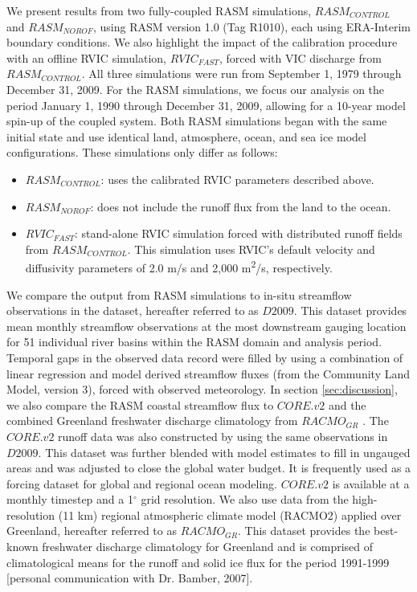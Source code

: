 \documentclass[jgrga, draft]{agutex}
\begin{document}
\begin{article}
We present results from two fully-coupled RASM simulations, $RASM_{CONTROL}$ and $RASM_{NOROF}$, using RASM version 1.0 (Tag R1010), each using ERA-Interim boundary conditions.
We also highlight the impact of the calibration procedure with an offline RVIC simulation, $RVIC_{FAST}$, forced with VIC discharge from $RASM_{CONTROL}$.
All three simulations were run from September 1, 1979 through December 31, 2009.
For the RASM simulations, we focus our analysis on the period January 1, 1990 through December 31, 2009, allowing for a 10-year model spin-up of the coupled system.
Both RASM simulations began with the same initial state \citep[see ][]{Hamman_2016} and use identical land, atmosphere, ocean, and sea ice model configurations.
These simulations only differ as follows:
\begin{itemize}[leftmargin=+.5in]
  \item $RASM_{CONTROL}$: uses the calibrated RVIC parameters described above.
  \item $RASM_{NOROF}$: does not include the runoff flux from the land to the ocean.
  \item $RVIC_{FAST}$: stand-alone RVIC simulation forced with distributed runoff fields from $RASM_{CONTROL}$.
  This simulation uses RVIC's default velocity and diffusivity parameters of 2.0 m/s and 2,000 m\textsuperscript{2}/s, respectively.
\end{itemize}

We compare the output from RASM simulations to in-situ streamflow observations in the \citet{Dai_2009} dataset, hereafter referred to as $D2009$.
This dataset provides mean monthly streamflow observations at the most downstream gauging location for 51 individual river basins within the RASM domain and analysis period.
Temporal gaps in the observed data record were filled by \citet{Dai_2009} using a combination of linear regression and model derived streamflow fluxes (from the Community Land Model, version 3), forced with observed meteorology.
In section \ref{sec:discussion}, we also compare the RASM coastal streamflow flux to $CORE.v2$ \citep{Large_2009} and the combined Greenland freshwater discharge climatology from $RACMO_{GR}$ \citep[e.g.][]{Bougamont_2005,Bougamont_2007,Rignot_2006}.
The $CORE.v2$ runoff data was also constructed by \citet{Dai_2009} using the same observations in $D2009$.
This dataset was further blended with model estimates to fill in ungauged areas and was adjusted to close the global water budget.
It is frequently used as a forcing dataset for global and regional ocean modeling.
$CORE.v2$ is available at a monthly timestep and a 1$^{\circ}$ grid resolution.
We also use data from the high-resolution (11 km) regional atmospheric climate model (RACMO2) applied over Greenland, hereafter referred to as $RACMO_{GR}$.
This dataset provides the best-known freshwater discharge climatology for Greenland and is comprised of climatological means for the runoff and solid ice flux for the period 1991-1999 [personal communication with Dr. Bamber, 2007].


\end{article}
\end{document}
